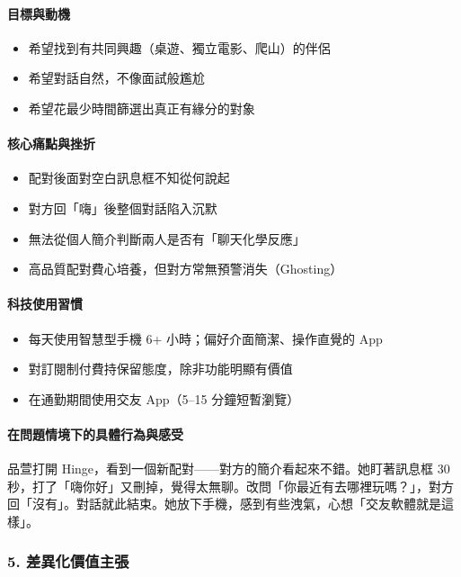\documentclass[12pt, a4paper]{article}
\begin{document}
\paragraph{目標與動機}
\begin{itemize}[leftmargin=2em, noitemsep]
  \item 希望找到有共同興趣（桌遊、獨立電影、爬山）的伴侶
  \item 希望對話自然，不像面試般尷尬
  \item 希望花最少時間篩選出真正有緣分的對象
\end{itemize}

\paragraph{核心痛點與挫折}
\begin{itemize}[leftmargin=2em, noitemsep]
  \item 配對後面對空白訊息框不知從何說起
  \item 對方回「嗨」後整個對話陷入沉默
  \item 無法從個人簡介判斷兩人是否有「聊天化學反應」
  \item 高品質配對費心培養，但對方常無預警消失（Ghosting）
\end{itemize}

\paragraph{科技使用習慣}
\begin{itemize}[leftmargin=2em, noitemsep]
  \item 每天使用智慧型手機 6+ 小時；偏好介面簡潔、操作直覺的 App
  \item 對訂閱制付費持保留態度，除非功能明顯有價值
  \item 在通勤期間使用交友 App（5--15 分鐘短暫瀏覽）
\end{itemize}

\paragraph{在問題情境下的具體行為與感受}

品萱打開 Hinge，看到一個新配對——對方的簡介看起來不錯。她盯著訊息框 30 秒，打了「嗨你好」又刪掉，覺得太無聊。改問「你最近有去哪裡玩嗎？」，對方回「沒有」。對話就此結束。她放下手機，感到有些洩氣，心想「交友軟體就是這樣」。

\subsubsection*{5. 差異化價值主張}
\end{document}
